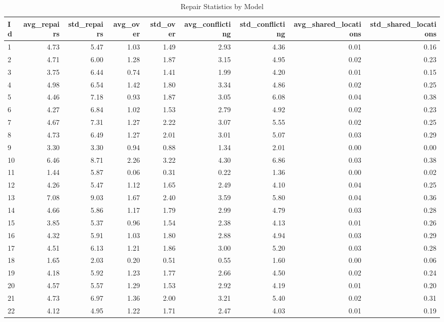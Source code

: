 \begin{table}
\caption{Repair Statistics by Model}
\label{tab:repair_stats}
\begin{tabular}{lrrrrrrrr}
\toprule
Id & avg_repairs & std_repairs & avg_over & std_over & avg_conflicting & std_conflicting & avg_shared_locations & std_shared_locations \\
\midrule
1 & 4.73 & 5.47 & 1.03 & 1.49 & 2.93 & 4.36 & 0.01 & 0.16 \\
2 & 4.71 & 6.00 & 1.28 & 1.87 & 3.15 & 4.95 & 0.02 & 0.23 \\
3 & 3.75 & 6.44 & 0.74 & 1.41 & 1.99 & 4.20 & 0.01 & 0.15 \\
4 & 4.98 & 6.54 & 1.42 & 1.80 & 3.34 & 4.86 & 0.02 & 0.25 \\
5 & 4.46 & 7.18 & 0.93 & 1.87 & 3.05 & 6.08 & 0.04 & 0.38 \\
6 & 4.27 & 6.84 & 1.02 & 1.53 & 2.79 & 4.92 & 0.02 & 0.23 \\
7 & 4.67 & 7.31 & 1.27 & 2.22 & 3.07 & 5.55 & 0.02 & 0.25 \\
8 & 4.73 & 6.49 & 1.27 & 2.01 & 3.01 & 5.07 & 0.03 & 0.29 \\
9 & 3.30 & 3.30 & 0.94 & 0.88 & 1.34 & 2.01 & 0.00 & 0.00 \\
10 & 6.46 & 8.71 & 2.26 & 3.22 & 4.30 & 6.86 & 0.03 & 0.38 \\
11 & 1.44 & 5.87 & 0.06 & 0.31 & 0.22 & 1.36 & 0.00 & 0.02 \\
12 & 4.26 & 5.47 & 1.12 & 1.65 & 2.49 & 4.10 & 0.04 & 0.25 \\
13 & 7.08 & 9.03 & 1.67 & 2.40 & 3.59 & 5.80 & 0.04 & 0.36 \\
14 & 4.66 & 5.86 & 1.17 & 1.79 & 2.99 & 4.79 & 0.03 & 0.28 \\
15 & 3.85 & 5.37 & 0.96 & 1.54 & 2.38 & 4.13 & 0.01 & 0.26 \\
16 & 4.32 & 5.91 & 1.03 & 1.80 & 2.88 & 4.94 & 0.03 & 0.29 \\
17 & 4.51 & 6.13 & 1.21 & 1.86 & 3.00 & 5.20 & 0.03 & 0.28 \\
18 & 1.65 & 2.03 & 0.20 & 0.51 & 0.55 & 1.60 & 0.00 & 0.06 \\
19 & 4.18 & 5.92 & 1.23 & 1.77 & 2.66 & 4.50 & 0.02 & 0.24 \\
20 & 4.57 & 5.57 & 1.29 & 1.53 & 2.92 & 4.19 & 0.01 & 0.20 \\
21 & 4.73 & 6.97 & 1.36 & 2.00 & 3.21 & 5.40 & 0.02 & 0.31 \\
22 & 4.12 & 4.95 & 1.22 & 1.71 & 2.47 & 4.03 & 0.01 & 0.19 \\

\end{tabular}
\end{table}
